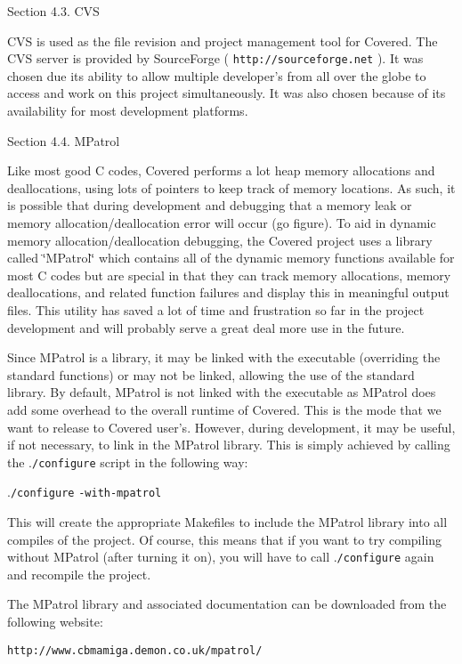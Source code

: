 \begin{Desc}
\item[Section 4.3.  CVS]\par
 CVS is used as the file revision and project management tool for Covered. The CVS server is provided by Source\-Forge ( {\tt http://sourceforge.net} ). It was chosen due its ability to allow multiple developer's from all over the globe to access and work on this project simultaneously. It was also chosen because of its availability for most development platforms.\end{Desc}


\begin{Desc}
\item[Section 4.4.  MPatrol]\par
 Like most good C codes, Covered performs a lot heap memory allocations and deallocations, using lots of pointers to keep track of memory locations. As such, it is possible that during development and debugging that a memory leak or memory allocation/deallocation error will occur (go figure). To aid in dynamic memory allocation/deallocation debugging, the Covered project uses a library called \char`\"{}MPatrol\char`\"{} which contains all of the dynamic memory functions available for most C codes but are special in that they can track memory allocations, memory deallocations, and related function failures and display this in meaningful output files. This utility has saved a lot of time and frustration so far in the project development and will probably serve a great deal more use in the future.

 Since MPatrol is a library, it may be linked with the executable (overriding the standard functions) or may not be linked, allowing the use of the standard library. By default, MPatrol is not linked with the executable as MPatrol does add some overhead to the overall runtime of Covered. This is the mode that we want to release to Covered user's. However, during development, it may be useful, if not necessary, to link in the MPatrol library. This is simply achieved by calling the .{\tt /configure} script in the following way:

 .{\tt /configure} {\tt -with-mpatrol}

 This will create the appropriate Makefiles to include the MPatrol library into all compiles of the project. Of course, this means that if you want to try compiling without MPatrol (after turning it on), you will have to call .{\tt /configure} again and recompile the project.

 The MPatrol library and associated documentation can be downloaded from the following website:

 {\tt http://www.cbmamiga.demon.co.uk/mpatrol/}\end{Desc}



